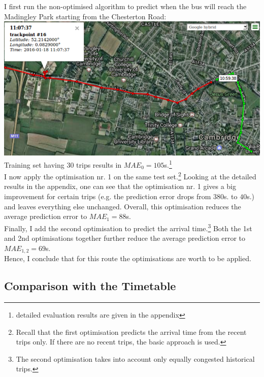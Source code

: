 \documentclass[12pt,a4paper,oneside,openright]{report}
\begin{document}
I first run the non-optimised algorithm to predict when the bus will reach the
Madingley Park starting from the Chesterton Road: \\

\includegraphics[width=\textwidth]{figs/madingley.png} \\

Training set having $30$ trips results in $MAE_0 = 105$s.\footnote{detailed
evaluation results are given in the appendix} \\

I now apply the optimisation nr. 1 on the same test set.\footnote{Recall that
the first optimisation predicts the arrival time from the recent trips only.
If there are no recent trips, the basic approach is used.} Looking at the
detailed results in the appendix, one can see that the
optimisation nr. 1 gives a big improvement for certain trips (e.g. the
prediction error drops from $380$s. to $40$s.) and leaves everything else
unchanged. Overall, this optimisation reduces the average prediction error to
$MAE_1 = 88$s. \\

Finally, I add the second optimisation to predict the arrival time.\footnote{The
second optimisation takes into account only equally congested historical trips.}
Both the 1st and 2nd optimisations together further reduce the average
prediction error to $MAE_{1,2} = 69$s. \\

Hence, I conclude that for this route the optimisations are worth to be applied.

\newpage

\subsection*{Comparison with the Timetable}
\end{document}
